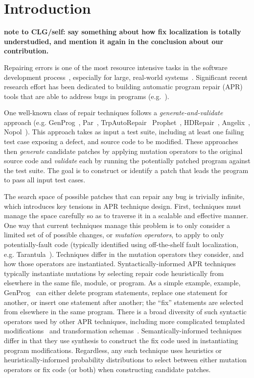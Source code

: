 \documentclass[conference]{IEEEtran}
\newcommand{\todo}[1]
  {{\scriptsize \textbf{\color{red} {#1}}}}
\begin{document}
\section{Introduction} \label{introduction}

\todo{note to CLG/self: say something about how fix localization is totally
  understudied, and mention it again in the conclusion about our contribution.}

Repairing errors is one of the most 
resource intensive tasks in 
the software development process~\cite{Weiss07,Tassey02,Britton13}, especially for large, real-world systems~\cite{Liblit03,Anvik05}.
%
Significant recent research effort has been dedicated to
building automatic program repair (APR) tools that are able to address
bugs in 
programs (e.g.~\cite{legoues12,kim2013,Weimer13,fan15SPR,long16proph,debroy10,perkins09,wei10}).

One well-known class of repair techniques follows a 
\emph{generate-and-validate} approach  (e.g. GenProg~\cite{legoues12}, 
Par~\cite{kim2013}, TrpAutoRepair~\cite{Qi13TrpAutoR}
Prophet~\cite{long16proph}, HDRepair~\cite{xuan16}, Angelix~\cite{angelix},
Nopol~\cite{nopol}).  This approach takes as input a test suite, 
including at
least one failing test case exposing
a defect, and source code to be 
modified.  These approaches then \emph{generate} candidate patches
by applying 
mutation operators to the original source code and \emph{validate} each by
running the potentially patched program against the test suite.  The goal is to
construct or identify a patch that
leads the program to pass all input test cases. 

The search space of possible patches that can repair any bug is trivially
infinite, which introduces key tensions in APR
technique design.  First, 
techniques must manage the space carefully so as to traverse it in a scalable and
effective manner.  One way that current techniques manage this problem is to
only consider a limited set of of possible changes, or \emph{mutation operators}, 
to apply to only potentially-fault code (typically identified using off-the-shelf fault 
localization, e.g. Tarantula~\cite{Jones02}).  
Techniques differ in the mutation operators they consider, and how those operators
are instantiated.  Syntactically-informed APR techniques typically instantiate
mutations by selecting repair code heuristically from elsewhere in the same
file, module, or program.  As a simple example, example, GenProg~\cite{legoues12} can either
delete program statements, replace one statement for another, or insert one
statement after another; the ``fix'' statements are selected from elsewhere in
the same program.  There is a broad diversity of such syntactic operators used
by other APR techniques, including more complicated templated modifications~\cite{kim2013} and transformation 
schemas~\cite{long16proph,long15SPR}.  Semantically-informed
techniques~\cite{semfix,angelix,nopol} differ in that they use synthesis to
construct the fix code used in instantiating program modifications.  
Regardless, any such technique uses heuristics or heuristically-informed
probability distributions to select between either mutation operators or fix
code (or both) when constructing candidate patches. 
\end{document}
